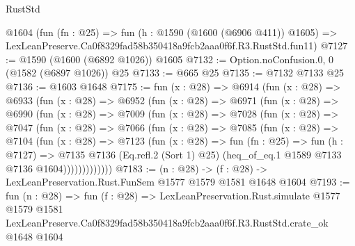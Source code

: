 \begin{lexlean}{RustStd}
\begin{coremodule}
    @1604
    (fun (fn : @25) =>
    fun (h : @1590 (@1600 (@6906 @411)) @1605) =>
    LexLeanPreserve.Ca0f8329fad58b350418a9fcb2aaa0f6f.R3.RustStd.fun11)
@7127 := @1590 (@1600 (@6892 @1026)) @1605
@7132 := Option.noConfusion.{0, 0} (@1582 (@6897 @1026)) @25
@7133 := @665 @25
@7135 := @7132 @7133 @25
@7136 := @1603 @1648
@7175 := fun (x : @28) =>
  @6914
    (fun (x : @28) =>
    @6933
      (fun (x : @28) =>
      @6952
        (fun (x : @28) =>
        @6971
          (fun (x : @28) =>
          @6990
            (fun (x : @28) =>
            @7009
              (fun (x : @28) =>
              @7028
                (fun (x : @28) =>
                @7047
                  (fun (x : @28) =>
                  @7066
                    (fun (x : @28) =>
                    @7085
                      (fun (x : @28) =>
                      @7104
                        (fun (x : @28) =>
                        @7123
                          (fun (x : @28) =>
                          fun (fn : @25) =>
                          fun (h : @7127) =>
                          @7135
                            @7136
                            (Eq.refl.{2} (Sort 1) @25)
                            (heq_of_eq.{1} @1589 @7133 @7136 @1604)))))))))))))
@7183 := (n : @28) -> (f : @28) -> LexLeanPreservation.Rust.FunSem @1577 @1579 @1581 @1648 @1604
@7193 := fun (n : @28) =>
  fun (f : @28) =>
  LexLeanPreservation.Rust.simulate
    @1577
    @1579
    @1581
    LexLeanPreserve.Ca0f8329fad58b350418a9fcb2aaa0f6f.R3.RustStd.crate_ok
    @1648
    @1604
\end{coremodule}
\end{lexlean}
